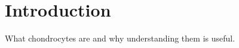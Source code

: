 \section{Introduction}
\label{introduction}

What chondrocytes are and why understanding them is useful.

